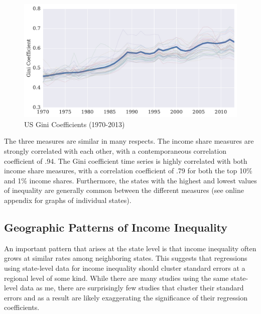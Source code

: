 \documentclass[11pt]{article}
\theoremstyle{definition}
\numberwithin{equation}{section}
\begin{document}
\begin{itemize}
	\begin{figure}[htb!]  	
	\begin{center}	
	\caption{US Gini Coefficients (1970-2013) \label{fig:gini_timeline}}	
	\includegraphics[width=6.3in]{../figures/inc_inequality/UnitedStates_gini_timeline.pdf}
	\end{center}
	\end{figure}

\end{itemize}

The three measures are similar in many respects. The income share measures are strongly correlated with each other, with a contemporaneous correlation coefficient of .94. The Gini coefficient time series is highly correlated with both income share measures, with a correlation coefficient of .79 for both the top 10\% and 1\% income shares. Furthermore, the states with the highest and lowest values of inequality are generally common between the different measures (see online appendix for graphs of individual states).

\subsection{Geographic Patterns of Income Inequality}
An important pattern that arises at the state level is that income inequality often grows at similar rates among neighboring states. This suggests that regressions using state-level data for income inequality should cluster standard errors at a regional level of some kind. While there are many studies using the same state-level data as me, there are surprisingly few studies that cluster their standard errors and as a result are likely exaggerating the significance of their regression coefficients.
\end{document}

